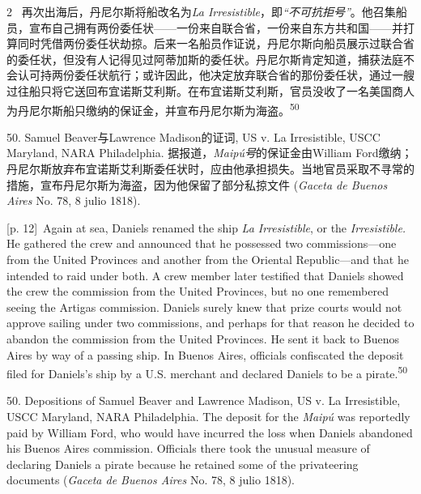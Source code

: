 \documentclass[10pt,a4paper]{article}
\begin{document}
\begin{paracol}{2}
\switchcolumn*
{\scriptsize\color{gray} [p. 12]}\ 再次出海后，丹尼尔斯将船改名为\textit{La Irresistible}，即\textit{“不可抗拒号”}。他召集船员，宣布自己拥有两份委任状——一份来自联合省，一份来自东方共和国——并打算同时凭借两份委任状劫掠。后来一名船员作证说，丹尼尔斯向船员展示过联合省的委任状，但没有人记得见过阿蒂加斯的委任状。丹尼尔斯肯定知道，捕获法庭不会认可持两份委任状航行；或许因此，他决定放弃联合省的那份委任状，通过一艘过往船只将它送回布宜诺斯艾利斯。在布宜诺斯艾利斯，官员没收了一名美国商人为丹尼尔斯船只缴纳的保证金，并宣布丹尼尔斯为海\mbox{盗。\textsuperscript{50}}\par{\small 50. Samuel Beaver与Lawrence Madison的证词, US v. La Irresistible, USCC Maryland, NARA Philadelphia. 据报道，\textit{Maipú号}的保证金由William Ford缴纳；丹尼尔斯放弃布宜诺斯艾利斯委任状时，应由他承担损失。当地官员采取不寻常的措施，宣布丹尼尔斯为海盗，因为他保留了部分私掠文件 (\textit{Gaceta de Buenos Aires} No. 78, 8 julio 1818).\par}
\switchcolumn
{\scriptsize\color{gray} [p. 12]}\ Again at sea, Daniels renamed the ship \textit{La Irresistible}, or the \textit{Irresistible.} He gathered the crew and announced that he possessed two commissions—one from the United Provinces and another from the Oriental Republic—and that he intended to raid under both. A crew member later testified that Daniels showed the crew the commission from the United Provinces, but no one remembered seeing the Artigas commission. Daniels surely knew that prize courts would not approve sailing under two commissions, and perhaps for that reason he decided to abandon the commission from the United Provinces. He sent it back to Buenos Aires by way of a passing ship. In Buenos Aires, officials confiscated the deposit filed for Daniels’s ship by a U.S. merchant and declared Daniels to be a pirate.\nobreak\textsuperscript{50}\par{\small 50. Depositions of Samuel Beaver and Lawrence Madison, US v. La Irresistible, USCC Maryland, NARA Philadelphia. The deposit for the \textit{Maipú} was reportedly paid by William Ford, who would have incurred the loss when Daniels abandoned his Buenos Aires commission. Officials there took the unusual measure of declaring Daniels a pirate because he retained some of the privateering documents (\textit{Gaceta de Buenos Aires} No. 78, 8 julio 1818).\par}
\switchcolumn*

\end{paracol}
\end{document}
